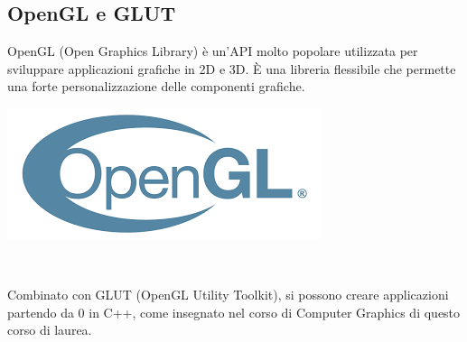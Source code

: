 \documentclass[a4paper,12pt]{report}
\begin{document}
\subsection{OpenGL e GLUT}
\begin{minipage}{0.7\textwidth}
    OpenGL (Open Graphics Library) è un'API molto popolare utilizzata per sviluppare applicazioni grafiche in 2D e 3D. È una libreria flessibile che permette una forte personalizzazione delle componenti grafiche.
\end{minipage}
\hfill
\begin{minipage}{0.3\textwidth}
  \includegraphics[width=\textwidth]{img/opengl.png}
\end{minipage}\\
\par
Combinato con GLUT (OpenGL Utility Toolkit), si possono creare applicazioni partendo da 0 in C++, come insegnato nel corso di Computer Graphics di questo corso di laurea.
%
\end{document}
